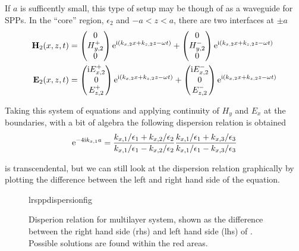 If $a$ is sufficently small, this type of setup may be though of as a waveguide for SPPs.
In the ``core'' region, $\epsilon_2$ and $-a<z<a$, there are two interfaces at $\pm a$
\begin{align}
\mathbf{H}_2(x,z,t) &=
\begin{pmatrix}
0\\
H^+_{y,2}\\
0
\end{pmatrix} {\mathrm{e}}^{{\mathrm{i}}(k_{x,2}x+k_{z,2}z-\omega t)}
+
\begin{pmatrix}
0\\
H^-_{y,2}\\
0
\end{pmatrix} {\mathrm{e}}^{{\mathrm{i}}(k_{x,2}x+k_{z,2}z-\omega t)} \\
\mathbf{E}_2(x,z,t) &=
\begin{pmatrix}
{\mathrm{i}} E^+_{x,2}\\
0\\
E^+_{z,2}\\
\end{pmatrix} {\mathrm{e}}^{{\mathrm{i}}(k_{x,2}x+k_{z,2}z-\omega t)}
+
\begin{pmatrix}
{\mathrm{i}} E^-_{x,2}\\
0\\
E^-_{z,2}\\
\end{pmatrix} {\mathrm{e}}^{{\mathrm{i}}(k_{x,2}x+k_{z,2}z-\omega t)}
\end{align}

Taking this system of equations and applying continuity of $H_y$ and $E_x$
at the boundaries, with a bit of algebra the following dispersion relation
is obtained
\begin{equation}
{\mathrm{e}}^{-4 {\mathrm{i}} k_{x,1} a} = 
\frac{k_{x,1}/\epsilon_1 + k_{x,2}/\epsilon_2}
     {k_{x,1}/\epsilon_1 - k_{x,2}/\epsilon_2}
\frac{k_{x,1}/\epsilon_1 + k_{x,3}/\epsilon_3}
     {k_{x,1}/\epsilon_1 - k_{x,3}/\epsilon_3}
\label{eqn:lrsppdispersion}
\end{equation}

 is transcendental, but we can still look at
the dispersion relation graphically by plotting the difference between the
left and right hand side of the equation.

\begin{figure}[ht]
 \centering
{lrsppdispersionfig}
\label{fig:lrsppdispersionrelation}
\caption{Disperion relation for multilayer system, shown as the difference
 between the right hand side (rhs) and left hand side (lhs) of
.  Possible solutions are found within the
red areas.}
\end{figure}

